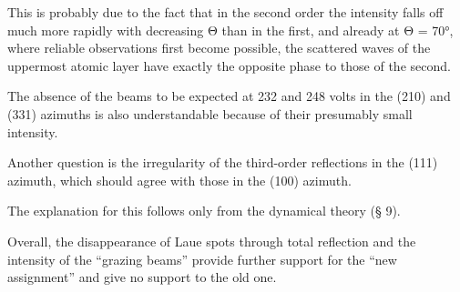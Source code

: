 \documentclass[10pt]{article}
\begin{document}
This is probably due to the fact that in the second order the intensity falls off much more rapidly with decreasing Θ than in the first, and already at Θ = 70°, where reliable observations first become possible, the scattered waves of the uppermost atomic layer have exactly the opposite phase to those of the second.\par
The absence of the beams to be expected at 232 and 248 volts in the (210) and (331) azimuths is also understandable because of their presumably small intensity.\par
Another question is the irregularity of the third-order reflections in the (111) azimuth, which should agree with those in the (100) azimuth.\par
The explanation for this follows only from the dynamical theory (§ 9).\par
Overall, the disappearance of Laue spots through total reflection and the intensity of the “grazing beams” provide further support for the “new assignment” and give no support to the old one.\par
\end{document}
